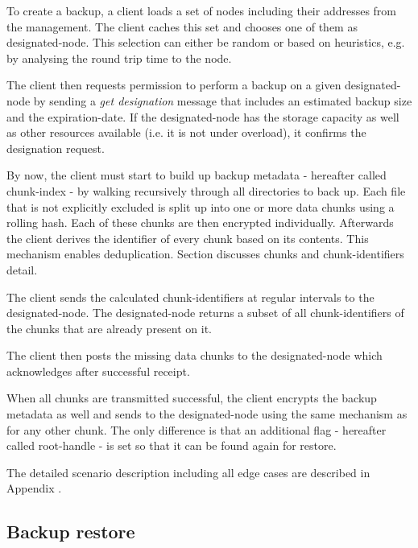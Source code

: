 To create a backup, a \gls{client} loads a set of \glspl{node} including their addresses from the \gls{management}. The \gls{client} caches this set and chooses one of them as \gls{designated-node}. This selection can either be random or based on heuristics, e.g. by analysing the round trip time to the \gls{node}.

The \gls{client} then requests permission to perform a backup on a given \gls{designated-node} by sending a \emph{get designation} message that includes an estimated backup size and the \gls{expiration-date}. If the \gls{designated-node} has the storage capacity as well as other resources available (i.e. it is not under overload), it confirms the designation request.

By now, the \gls{client} must start to build up backup metadata - hereafter called \gls{chunk-index} - by walking recursively through all directories to back up. Each file that is not explicitly excluded is split up into one or more data \glspl{chunk} using a rolling hash\cite{borg-data-structures}. Each of these \glspl{chunk} are then encrypted individually. Afterwards the \gls{client} derives the identifier of every \gls{chunk} based on its contents. This mechanism enables deduplication. Section  discusses \glspl{chunk} and \glspl{chunk-identifier} detail.

The \gls{client} sends the calculated \glspl{chunk-identifier} at regular intervals to the \gls{designated-node}. The \gls{designated-node} returns a subset of all \glspl{chunk-identifier} of the \glspl{chunk} that are already present on it.

The \gls{client} then posts the missing data \glspl{chunk} to the \gls{designated-node} which acknowledges after successful receipt.

When all \glspl{chunk} are transmitted successful, the client encrypts the backup metadata as well and sends to the \gls{designated-node} using the same mechanism as for any other \gls{chunk}. The only difference is that an additional flag - hereafter called \gls{root-handle} - is set so that it can be found again for restore.

The detailed scenario description including all edge cases are described in Appendix .

\subsection{Backup restore}

